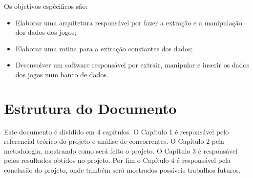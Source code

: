 	Os objetivos espécificos são:
	\begin{itemize}
		\item Elaborar uma arquitetura responsável por fazer a extração e a manipulação dos dados dos jogos;
		\item Elaborar uma rotina para a extração constantes dos dados;
		\item Desenvolver um software responsável por extrair, manipular e inserir os dados dos jogos num banco de dados.
	\end{itemize}
\section*{Estrutura do Documento}
Este documento é dividido em 4 capítulos. O Capítulo 1 é responsável pelo referencial teórico do projeto e análise de concorrentes. O Capítulo 2 pela metodologia, mostrando como será feito o projeto. O Capítulo 3 é responsável pelos resultados obtidos no projeto. Por fim o Capítulo 4 é responsável pela conclusão do projeto, onde também será mostrados possíveis trabalhos futuros.